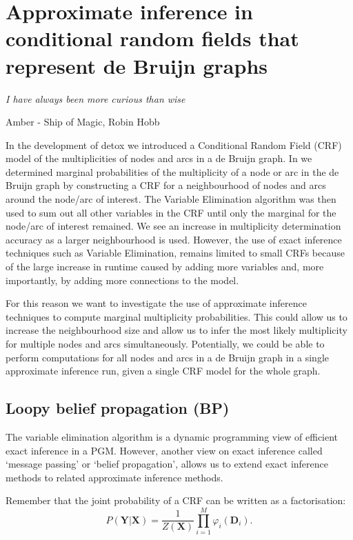 \chapter{Approximate inference in conditional random fields that represent  de Bruijn graphs}\label{ch3}
\setlength{\epigraphrule}{0pt}
\setlength{\epigraphwidth}{0.75\textwidth}
\epigraph{\textit{I have always been more curious than wise}}{Amber - Ship of Magic, Robin Hobb}


In the development of detox \citep{Steyaert2020} we introduced a Conditional Random Field (CRF) model of the multiplicities of nodes and arcs in a de Bruijn graph. In \citep{Steyaert2020} we determined marginal probabilities of the multiplicity of a node or arc in the de Bruijn graph by constructing a CRF for a neighbourhood of nodes and arcs around the node/arc of interest. The Variable Elimination algorithm was then used to sum out all other variables in the CRF until only the marginal for the node/arc of interest remained.
We see an increase in multiplicity determination accuracy as a larger neighbourhood is used. However, the use of exact inference techniques such as Variable Elimination, remains limited to small CRFs because of the large increase in runtime caused by adding more variables and, more importantly, by adding more connections to the model.

For this reason we want to investigate the use of approximate inference techniques to compute marginal multiplicity probabilities. This could allow us to increase the neighbourhood size and allow us to infer the most likely multiplicity for multiple nodes and arcs simultaneously. Potentially, we could be able to perform computations for all nodes and arcs in a de Bruijn graph in a single approximate inference run, given a single CRF model for the whole graph.

\section{Loopy belief propagation (BP)}

The variable elimination algorithm is a dynamic programming view of efficient exact inference in a PGM. However, another view on exact inference called `message passing' or `belief propagation', allows us to extend exact inference methods to related approximate inference methods.

Remember that the joint probability of a CRF can be written as a factorisation:
\begin{equation}
	P(\mathbf{Y}|\mathbf{X}) = \dfrac{1}{Z(\mathbf{X})}\prod_{i=1}^M \varphi_i(\mathbf{D}_i). \label{eq:joint}
\end{equation}

